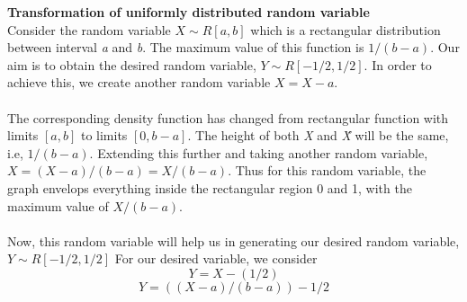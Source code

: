 \noindent \textbf{Transformation of uniformly distributed random variable}\\
\noindent Consider the random variable  $ X \sim R[a, b]$ which is a rectangular distribution between interval \textit{a} and \textit{b}. The maximum value of this function is $1/(b-a).$ Our aim is to obtain the desired random variable,   $ Y \sim R[-1/2, 1/2]$. In order to achieve this, we create another random variable $ \textit{\~{X}} = X - a.$\\ \\
\noindent The corresponding density function has changed from rectangular function with limits $[a, b]$ to limits $[0, b-a].$ The height of both \textit{X} and \textit{\~{X}} will be the same, i.e, $1/(b-a).$ Extending this further and taking another random variable, $\textit{\^X} = (X - a)/(b - a) =  \textit{\~{X}}/(b - a).$ Thus for this random variable, the graph envelops everything inside the rectangular region 0 and 1, with the maximum value of  $\textit{\~{X}}/(b - a).$ \\ \\
\noindent Now, this random variable will help us in generating our desired random variable,  $Y \sim R[-1/2, 1/2]$
\noindent For our desired variable, we consider 
$$Y = \textit{\^{X}} - (1/2) $$
$$Y = ((X - a) / (b - a)) - 1/2 $$
